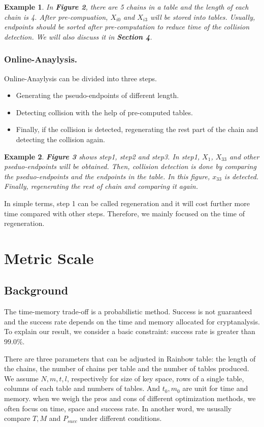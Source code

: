 \documentclass[runningheads,a4paper]{llncs}
\newtheorem{exm}{Example}
\begin{document}
\begin{exm}In \textbf{Figure 2}, there are 5 chains in a table and the length of each chain is 4. After pre-compuation, $X_{i0}$ and $X_{i3}$ will be stored into tables. Usually, endpoints should be sorted after pre-computation to reduce time of the collision detection. We will also discuss it in \textbf{Section 4}.\end{exm}

\subsubsection{Online-Anaylysis.} Online-Anaylysis can be divided into three steps.

\begin{itemize}
\item Generating the pseudo-endpoints of different length.
\item Detecting collision with the help of pre-computed tables.
\item Finally, if the collision is detected, regenerating the rest part of the chain and detecting the collision again.
\end{itemize}

\begin{exm}
\textbf{Figure 3} shows step1, step2 and step3. In step1, $X_1$, $X_{33}$ and other pseduo-endpoints will be obtained. Then, collision detection is done by comparing the pseduo-endpoints and the endpoints in the table. In this figure, $x_{33}$ is detected. Finally, regenerating the rest of chain and comparing it again.
\end{exm}

In simple terms, step 1 can be called regeneration and it will cost further more time compared with other steps. Therefore, we mainly focused on the time of regeneration.

\section{Metric Scale}
\subsection{Background}
The time-memory trade-off is a probabilistic method. Success is not guaranteed and the success rate depends on the time and memory allocated for cryptanalysis. To explain our result, we consider a basic constraint: success rate is greater than $99.0\%$. 

There are three parameters that can be adjusted in Rainbow table: the length of the chains, the number of chains per table and the number of tables produced. We assume $N, m, t, l$, respectively for size of key space, rows of a single table, columns of each table and numbers of tables. And $t_0, m_0$ are unit for time and memory. when we weigh the pros and cons of different optimization methods, we often focus on time, space and success rate. In another word, we ususally compare $T, M$ and $P_{succ}$ under different conditions.
\end{document}
